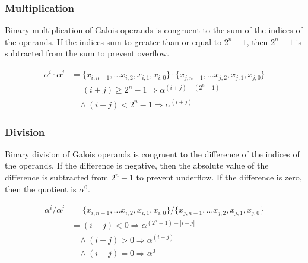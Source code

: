 \documentclass[paper=usletter, fontsize=12pt]{article}
\begin{document}
            \subsubsection{Multiplication}
            Binary multiplication of Galois operands is congruent to the sum of the indices of the operands. If the indices sum to greater than or equal to $2^{n}-1$, then $2^{n}-1$ is subtracted from the sum to prevent overflow.

                \begin{equation*}
                    \begin{split}
                        \alpha^{i} \cdot \alpha^{j} & = \{x_{i, n-1},\ldots x_{i, 2},x_{i, 1},x_{i, 0}\} \cdot \{x_{j, n-1}, \ldots x_{j, 2}, x_{j, 1}, x_{j, 0}\} \\
                        & = (i + j) \geq 2^{n}-1 \Longrightarrow \alpha^{(i + j) - (2^{n}-1)} \\
                        & \ \ \ \ \wedge (i + j) < 2^{n}-1 \Longrightarrow \alpha^{(i + j)}
                    \end{split}
                \end{equation*}

            \subsubsection{Division}
            Binary division of Galois operands is congruent to the difference of the indices of the operands. If the difference is negative, then the absolute value of the difference is subtracted from $2^{n}-1$ to prevent underflow. If the difference is zero, then the quotient is $\alpha^{0}$.

                \begin{equation*}
                    \begin{split}
                        \alpha^{i} / \alpha^{j} & = \{x_{i, n-1},\ldots x_{i, 2},x_{i, 1},x_{i, 0}\} / \{x_{j, n-1}, \ldots x_{j, 2}, x_{j, 1}, x_{j, 0}\} \\
                        & = (i - j) < 0 \Longrightarrow \alpha^{(2^{n}-1) - |i - j|} \\
                        & \ \ \ \ \wedge (i - j) > 0 \Longrightarrow \alpha^{(i - j)} \\
                        & \ \ \ \ \wedge (i - j) = 0 \Longrightarrow \alpha^{0}
                    \end{split}
                \end{equation*}
\end{document}
